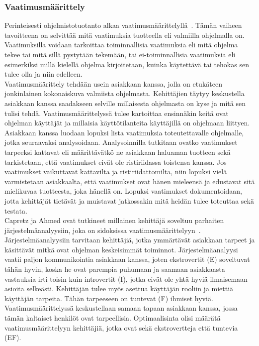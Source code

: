 \documentclass[finnish]{../tktltiki2}
\theoremstyle{definition}
\theoremstyle{remark}
\begin{document}
\subsubsection{Vaatimusmäärittely}

Perinteisesti ohjelmistotuotanto alkaa vaatimusmäärittelyllä~\cite{SWEBOK:409902,Sommerville:2005:IRE:1042197.1042341}. Tämän vaiheen tavoitteena on selvittää mitä vaatimuksia
tuotteella eli valmiilla ohjelmalla on. Vaatimuksilla voidaan tarkoittaa toiminnallisia vaatimuksia eli
mitä ohjelma tekee tai mitä sillä pystytään tekemään, tai ei-toiminnallisia vaatimuksia eli esimerkiksi millä kielellä
ohjelma kirjoitetaan, kuinka käytettävä tai tehokas sen tulee olla ja niin edelleen.\\

Vaatimusmäärittely tehdään usein asiakkaan kanssa, jolla on etukäteen jonkinlainen kokonaiskuva valmiista ohjelmasta.
Kehittäjien täytyy keskustella asiakkaan kanssa saadakseen selville millaisesta ohjelmasta on kyse ja mitä sen tulisi tehdä.
Vaatimusmäärittelyssä tulee kartoittaa ensinnäkin keitä ovat ohjelman käyttäjät ja millaisia käyttötilanteita
käyttäjillä on ohjelmaan liittyen. Asiakkaan kanssa luodaan lopuksi lista vaatimuksia toteutettavalle ohjelmalle,
jotka seuraavaksi analysoidaan. Analysoinnilla tutkitaan ovatko vaatimukset tarpeeksi kattavat eli määrittävätkö ne asiakkaan
haluaman tuotteen sekä tarkistetaan, että vaatimukset eivät ole ristiriidassa toistensa kanssa. Jos vaatimukset vaikuttavat
kattavilta ja ristiriidattomilta, niin lopuksi vielä varmistetaan asiakkaalta, että vaatimukset ovat hänen mieleensä ja
edustavat sitä mielikuvaa tuotteesta, joka hänellä on.
Lopuksi vaatimukset dokumentoidaan, jotta kehittäjät tietävät ja muistavat jatkossakin mitä heidän tulee toteuttaa sekä testata.\\

Capretz ja Ahmed ovat tutkineet millainen kehittäjä soveltuu
parhaiten järjestelmäanalyysiin, joka on sidoksissa vaatimusmäärittelyyn~\cite{Capretz:2010:MSS:1726559.1726574}.
Järjestelmä\-analyysiin tarvitaan kehittäjiä, jotka ymmärtävät asiakkaan tarpeet ja käsittävät mitkä ovat ohjelman keskeisimmät toiminnot.
Järjestelmäa\-nalyysi vaatii paljon kommunikointia asiakkaan kanssa,
joten ekstrovertit (E) soveltuvat tähän hyvin, koska he ovat parempia
puhumaan ja saamaan asiakkaasta vastauksia irti toisin kuin introvertit (I), jotka eivät ole yhtä hyviä ilmaisemaan asioita selkeästi. 
Kehittäjän tulee myös asettua käyttäjän rooliin ja miettiä
käyttäjän tarpeita. Tähän tarpeeseen on tuntevat (F) ihmiset hyviä. Vaatimusmäärittelyssä keskustellaan samaan tapaan asiakkaan kanssa, jossa tämän kaltaiset henkilöt ovat tarpeellisia. Optimaalisinta olisi määrätä vaatimusmäärittelyyn kehittäjiä, jotka ovat sekä ekstrovertteja että tuntevia (EF).\\
\end{document}
